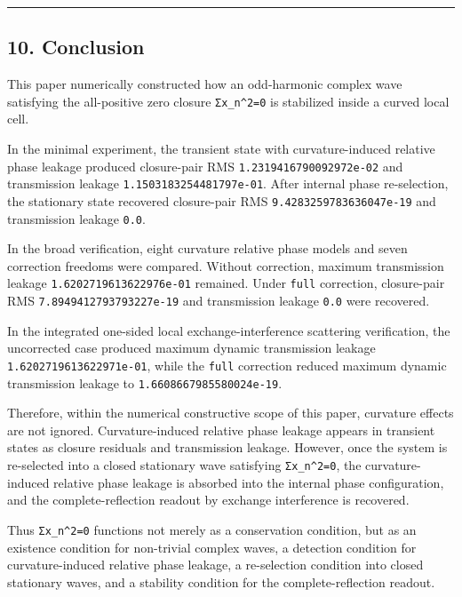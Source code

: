 \documentclass[
  a4paper,
]{article}
\begin{document}
\begin{center}\rule{0.5\linewidth}{0.5pt}\end{center}

\subsection{10. Conclusion}\label{conclusion}

This paper numerically constructed how an odd-harmonic complex wave
satisfying the all-positive zero closure \texttt{Σx\_n\^{}2=0} is
stabilized inside a curved local cell.

In the minimal experiment, the transient state with curvature-induced
relative phase leakage produced closure-pair RMS
\texttt{1.2319416790092972e-02} and transmission leakage
\texttt{1.1503183254481797e-01}. After internal phase re-selection, the
stationary state recovered closure-pair RMS
\texttt{9.4283259783636047e-19} and transmission leakage \texttt{0.0}.

In the broad verification, eight curvature relative phase models and
seven correction freedoms were compared. Without correction, maximum
transmission leakage \texttt{1.6202719613622976e-01} remained. Under
\texttt{full} correction, closure-pair RMS
\texttt{7.8949412793793227e-19} and transmission leakage \texttt{0.0}
were recovered.

In the integrated one-sided local exchange-interference scattering
verification, the uncorrected case produced maximum dynamic transmission
leakage \texttt{1.6202719613622971e-01}, while the \texttt{full}
correction reduced maximum dynamic transmission leakage to
\texttt{1.6608667985580024e-19}.

Therefore, within the numerical constructive scope of this paper,
curvature effects are not ignored. Curvature-induced relative phase
leakage appears in transient states as closure residuals and
transmission leakage. However, once the system is re-selected into a
closed stationary wave satisfying \texttt{Σx\_n\^{}2=0}, the
curvature-induced relative phase leakage is absorbed into the internal
phase configuration, and the complete-reflection readout by exchange
interference is recovered.

Thus \texttt{Σx\_n\^{}2=0} functions not merely as a conservation
condition, but as an existence condition for non-trivial complex waves,
a detection condition for curvature-induced relative phase leakage, a
re-selection condition into closed stationary waves, and a stability
condition for the complete-reflection readout.
\end{document}
